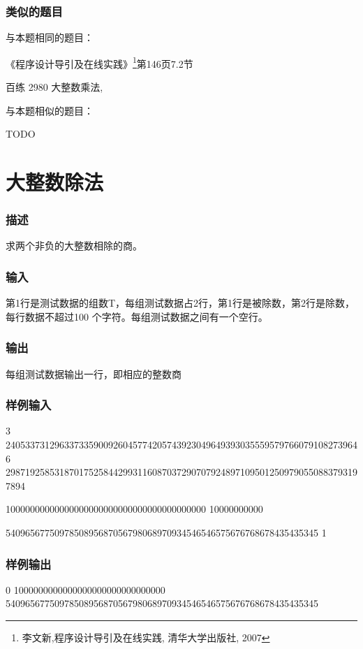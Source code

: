 \subsubsection{类似的题目}
与本题相同的题目：
\begindot
\item 《程序设计导引及在线实践》\footnote{李文新,程序设计导引及在线实践, 清华大学出版社, 2007}第146页7.2节
\item 百练 2980 大整数乘法, 
\myenddot

与本题相似的题目：
\begindot
\item  TODO
\myenddot


\section{大整数除法} %
\subsubsection{描述}
求两个非负的大整数相除的商。

\subsubsection{输入}
第1行是测试数据的组数T，每组测试数据占2行，第1行是被除数，第2行是除数，每行数据不超过100 个字符。每组测试数据之间有一个空行。

\subsubsection{输出}
每组测试数据输出一行，即相应的整数商

\subsubsection{样例输入}
\begin{Code}
3
2405337312963373359009260457742057439230496493930355595797660791082739646
2987192585318701752584429931160870372907079248971095012509790550883793197894

10000000000000000000000000000000000000000
10000000000

5409656775097850895687056798068970934546546575676768678435435345
1
\end{Code}

\subsubsection{样例输出}
\begin{Code}
0
1000000000000000000000000000000
5409656775097850895687056798068970934546546575676768678435435345
\end{Code}

